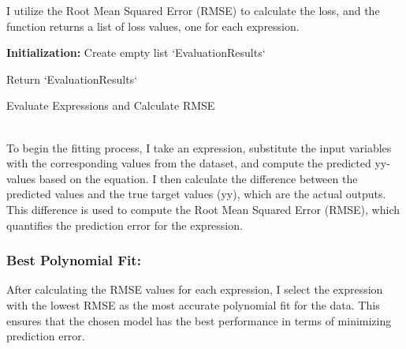 \documentclass{article}
\begin{document}
I utilize the Root Mean Squared Error (RMSE) to calculate the loss, and the function returns a list of loss values, one for each expression.\\



\begin{algorithm}[H]
\SetAlgoLined
{}

\textbf{Initialization:}\;
Create empty list `EvaluationResults`\;


Return `EvaluationResults`\;

\caption{Evaluate Expressions and Calculate RMSE}
\label{alg:evaluate_expressions} %
\end{algorithm}\\


To begin the fitting process, I take an expression, substitute the input variables with the corresponding values from the dataset, and compute the predicted yy-values based on the equation. I then calculate the difference between the predicted values and the true target values (yy), which are the actual outputs. This difference is used to compute the Root Mean Squared Error (RMSE), which quantifies the prediction error for the expression.\\

\subsubsection{Best Polynomial Fit:}

After calculating the RMSE values for each expression, I select the expression with the lowest RMSE as the most accurate polynomial fit for the data. This ensures that the chosen model has the best performance in terms of minimizing prediction error.\\
\end{document}
